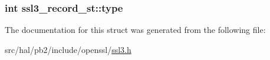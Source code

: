 \subsubsection[{\texorpdfstring{type}{type}}]{\setlength{\rightskip}{0pt plus 5cm}int ssl3\+\_\+record\+\_\+st\+::type}\hypertarget{structssl3__record__st_a51d0757184a963149122f4c020897002}{}\label{structssl3__record__st_a51d0757184a963149122f4c020897002}


The documentation for this struct was generated from the following file\+:\begin{DoxyCompactItemize}
\item 
src/hal/pb2/include/openssl/\hyperlink{ssl3_8h}{ssl3.\+h}\end{DoxyCompactItemize}
